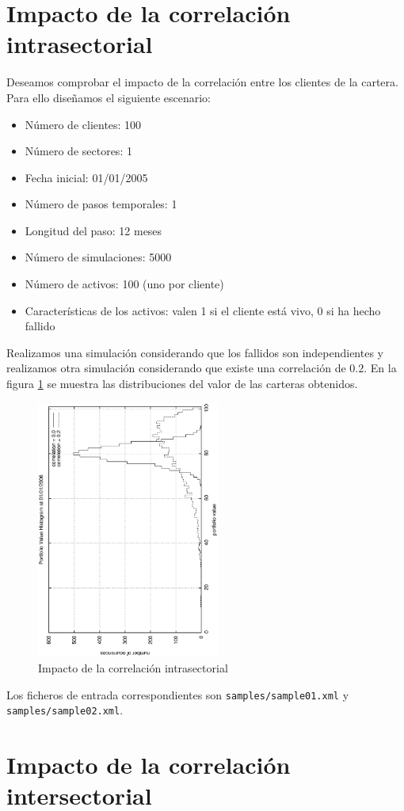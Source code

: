 \section{Impacto de la correlaci\'on intrasectorial}

Deseamos comprobar el impacto de la correlaci\'on entre los clientes de la 
cartera. Para ello dise\~namos el siguiente escenario:

\begin{itemize}
\item N\'umero de clientes: 100
\item N\'umero de sectores: 1
\item Fecha inicial: 01/01/2005
\item N\'umero de pasos temporales: 1
\item Longitud del paso: 12 meses
\item N\'umero de simulaciones: 5000
\item N\'umero de activos: 100 (uno por cliente)
\item Caracter\'isticas de los activos: valen 1 si el cliente est\'a vivo, 0 si 
ha hecho fallido
\end{itemize}

Realizamos una simulaci\'on considerando que los fallidos son independientes y 
realizamos otra simulaci\'on considerando que existe una correlaci\'on de
$0.2$. En la figura \ref{sectorcorrel} se muestra las distribuciones del 
valor de las carteras obtenidos.

\begin{figure}[!hb]
\begin{center}
\includegraphics[width=6cm,angle=-90]{./samples/sectorcorrel.ps}
\caption{Impacto de la correlaci\'on intrasectorial}
\label{sectorcorrel}
\end{center}
\end{figure}

Los ficheros de entrada correspondientes son \verb+samples/sample01.xml+ y 
\verb+samples/sample02.xml+.

\section{Impacto de la correlaci\'on intersectorial}

